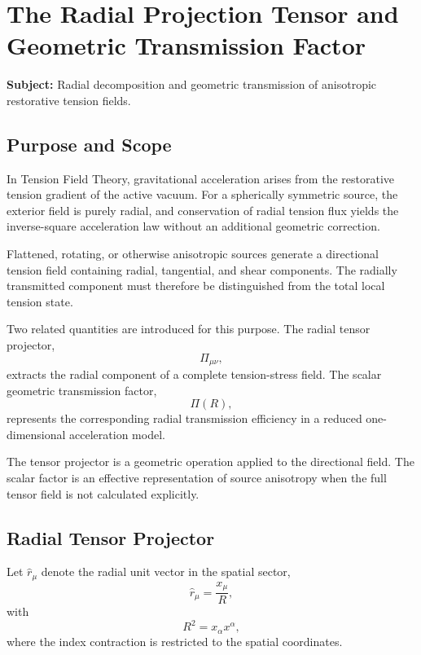 \chapter{The Radial Projection Tensor and Geometric Transmission Factor}
\label{app:radial_projection}

\noindent\textbf{Subject:} Radial decomposition and geometric transmission of anisotropic restorative tension fields.

\section{Purpose and Scope}

In Tension Field Theory, gravitational acceleration arises from the restorative tension gradient of the active vacuum. For a spherically symmetric source, the exterior field is purely radial, and conservation of radial tension flux yields the inverse-square acceleration law without an additional geometric correction.

Flattened, rotating, or otherwise anisotropic sources generate a directional tension field containing radial, tangential, and shear components. The radially transmitted component must therefore be distinguished from the total local tension state.

Two related quantities are introduced for this purpose. The radial tensor projector,
\begin{equation}
    \Pi_{\mu\nu},
\end{equation}
extracts the radial component of a complete tension-stress field. The scalar geometric transmission factor,
\begin{equation}
    \Pi(R),
\end{equation}
represents the corresponding radial transmission efficiency in a reduced one-dimensional acceleration model.

The tensor projector is a geometric operation applied to the directional field. The scalar factor is an effective representation of source anisotropy when the full tensor field is not calculated explicitly.

\section{Radial Tensor Projector}

Let $\hat{r}_{\mu}$ denote the radial unit vector in the spatial sector,
\begin{equation}
    \hat{r}_{\mu} = \frac{x_{\mu}}{R},
\end{equation}
with
\begin{equation}
    R^2 = x_{\alpha}x^{\alpha},
\end{equation}
where the index contraction is restricted to the spatial coordinates.

